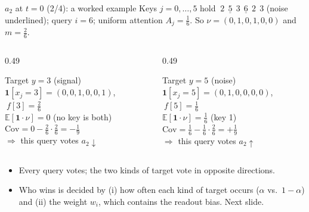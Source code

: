 \documentclass[aspectratio=169,11pt]{beamer}
\newcommand{\1}{\mathbf{1}}
\begin{document}
\begin{frame}{$a_2$ at $t=0$ (2/4): a worked example}
\small
Keys $j=0,\dots,5$ hold $\ 2\ \ \underline{5}\ \ 3\ \ \underline{6}\ \ 2\ \ 3$ (noise underlined); query $i=6$; uniform attention $A_j=\tfrac16$.
So $\nu=(0,1,0,1,0,0)$ and $m=\tfrac26$.
\begin{columns}[T]
\begin{column}{0.49\textwidth}
\begin{block}{Target $y=3$ (signal)}
$\1[x_j=3]=(0,0,1,0,0,1)$, $\ f[3]=\tfrac26$\\[0.3em]
$\mathbb E[\1\cdot\nu]=0$ (no key is both)\\[0.3em]
$\mathrm{Cov}=0-\tfrac26\cdot\tfrac26=-\tfrac19$\\[0.3em]
$\Rightarrow$ this query votes $a_2\downarrow$
\end{block}
\end{column}
\begin{column}{0.49\textwidth}
\begin{block}{Target $y=5$ (noise)}
$\1[x_j=5]=(0,1,0,0,0,0)$, $\ f[5]=\tfrac16$\\[0.3em]
$\mathbb E[\1\cdot\nu]=\tfrac16$ (key 1)\\[0.3em]
$\mathrm{Cov}=\tfrac16-\tfrac16\cdot\tfrac26=+\tfrac19$\\[0.3em]
$\Rightarrow$ this query votes $a_2\uparrow$
\end{block}
\end{column}
\end{columns}
\vspace{0.4em}
\begin{itemize}
\item Every query votes; the two kinds of target vote in opposite directions.
\item Who wins is decided by (i) how often each kind of target occurs ($\alpha$ vs.\ $1-\alpha$) and (ii) the weight $w_i$,
which contains the readout bias. Next slide.
\end{itemize}
\end{frame}
\end{document}
